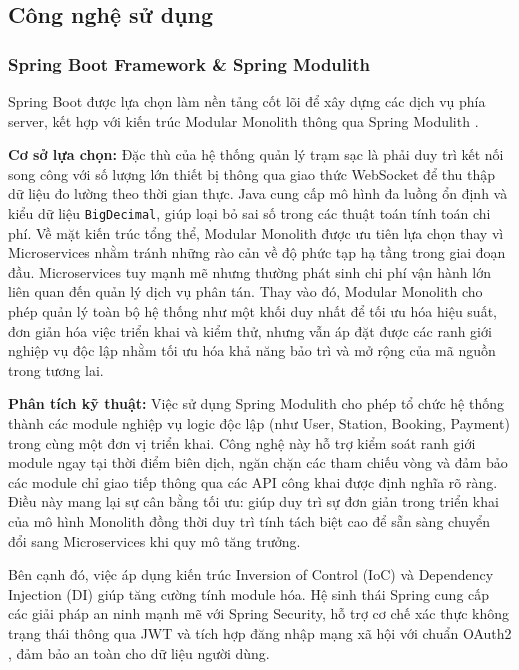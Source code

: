 \subsection{Công nghệ sử dụng}

\subsubsection{Spring Boot Framework \& Spring Modulith}
Spring Boot được lựa chọn làm nền tảng cốt lõi để xây dựng các dịch vụ phía server, kết hợp với kiến trúc Modular Monolith thông qua Spring Modulith \cite{spring_modulith}.

\textbf{Cơ sở lựa chọn:}
Đặc thù của hệ thống quản lý trạm sạc là phải duy trì kết nối song công với số lượng lớn thiết bị thông qua giao thức WebSocket để thu thập dữ liệu đo lường theo thời gian thực. Java cung cấp mô hình đa luồng ổn định và kiểu dữ liệu \texttt{BigDecimal}, giúp loại bỏ sai số trong các thuật toán tính toán chi phí. Về mặt kiến trúc tổng thể, Modular Monolith được ưu tiên lựa chọn thay vì Microservices nhằm tránh những rào cản về độ phức tạp hạ tầng trong giai đoạn đầu. Microservices tuy mạnh mẽ nhưng thường phát sinh chi phí vận hành lớn liên quan đến quản lý dịch vụ phân tán. Thay vào đó, Modular Monolith cho phép quản lý toàn bộ hệ thống như một khối duy nhất để tối ưu hóa hiệu suất, đơn giản hóa việc triển khai và kiểm thử, nhưng vẫn áp đặt được các ranh giới nghiệp vụ độc lập nhằm tối ưu hóa khả năng bảo trì và mở rộng của mã nguồn trong tương lai.

\textbf{Phân tích kỹ thuật:}
Việc sử dụng Spring Modulith cho phép tổ chức hệ thống thành các module nghiệp vụ logic độc lập (như User, Station, Booking, Payment) trong cùng một đơn vị triển khai. Công nghệ này hỗ trợ kiểm soát ranh giới module ngay tại thời điểm biên dịch, ngăn chặn các tham chiếu vòng và đảm bảo các module chỉ giao tiếp thông qua các API công khai được định nghĩa rõ ràng. Điều này mang lại sự cân bằng tối ưu: giúp duy trì sự đơn giản trong triển khai của mô hình Monolith đồng thời duy trì tính tách biệt cao để sẵn sàng chuyển đổi sang Microservices khi quy mô tăng trưởng.

Bên cạnh đó, việc áp dụng kiến trúc Inversion of Control (IoC) và Dependency Injection (DI) giúp tăng cường tính module hóa. Hệ sinh thái Spring cung cấp các giải pháp an ninh mạnh mẽ với Spring Security, hỗ trợ cơ chế xác thực không trạng thái thông qua JWT và tích hợp đăng nhập mạng xã hội với chuẩn OAuth2 \cite{oauth2_duende}, đảm bảo an toàn cho dữ liệu người dùng.

